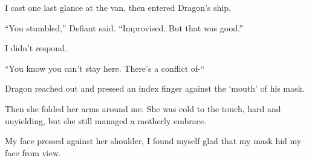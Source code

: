 I cast one last glance at the van, then entered Dragon's ship.



``You stumbled,'' Defiant said.  ``Improvised.  But that was good.''



I didn't respond.



``You know you can't stay here.  There's a conflict of-``



Dragon reached out and pressed an index finger against the `mouth' of his mask.



Then she folded her arms around me.  She was cold to the touch, hard and unyielding, but she still managed a motherly embrace.



My face pressed against her shoulder, I found myself glad that my mask hid my face from view.






